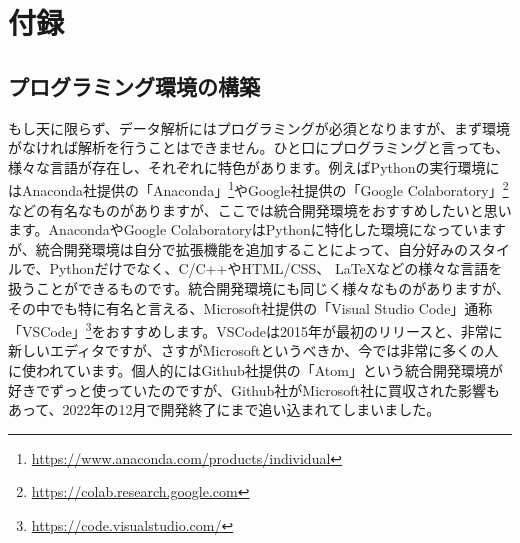 \chapter*{付録}
\label{chap:appendix}

\setcounter{section}{0} %
\renewcommand{\thesection}{\Alph{section}} %
\setcounter{equation}{0} %
\renewcommand{\theequation}{\Alph{section}.\arabic{equation}}
\setcounter{figure}{0} %
\renewcommand{\thefigure}{\Alph{section}.\arabic{figure}}
\setcounter{table}{0} %
\renewcommand{\thetable}{\Alph{section}.\arabic{table}}

\section{プログラミング環境の構築}
もし天に限らず、データ解析にはプログラミングが必須となりますが、まず環境がなければ解析を行うことはできません。ひと口にプログラミングと言っても、様々な言語が存在し、それぞれに特色があります。例えばPythonの実行環境にはAnaconda社提供の「Anaconda」\footnote{\url{https://www.anaconda.com/products/individual}}やGoogle社提供の「Google Colaboratory」\footnote{\url{https://colab.research.google.com}}などの有名なものがありますが、ここでは統合開発環境をおすすめしたいと思います。AnacondaやGoogle ColaboratoryはPythonに特化した環境になっていますが、統合開発環境は自分で拡張機能を追加することによって、自分好みのスタイルで、Pythonだけでなく、C/C++やHTML/CSS、 \LaTeX などの様々な言語を扱うことができるものです。統合開発環境にも同じく様々なものがありますが、その中でも特に有名と言える、Microsoft社提供の「Visual Studio Code」通称「VSCode」\footnote{\url{https://code.visualstudio.com/}}をおすすめします。VSCodeは2015年が最初のリリースと、非常に新しいエディタですが、さすがMicrosoftというべきか、今では非常に多くの人に使われています。個人的にはGithub社提供の「Atom」という統合開発環境が好きでずっと使っていたのですが、Github社がMicrosoft社に買収された影響もあって、2022年の12月で開発終了にまで追い込まれてしまいました。

